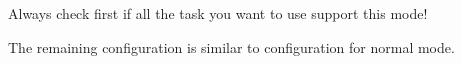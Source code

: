 Always check first if all the task you want to use support this mode!

The remaining configuration is similar to configuration for normal mode.

%
%
%
%
%
%
%
%
%
%
%

